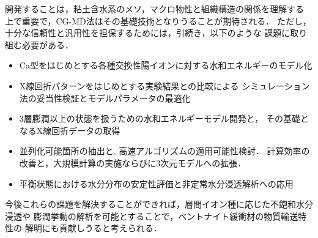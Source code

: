 ﻿\documentclass[11pt,a4j]{jarticle}
\begin{document}
開発することは，粘土含水系のメソ，マクロ物性と組織構造の関係を理解する
上で重要で，CG-MD法はその基礎技術となりうることが期待される．
ただし，十分な信頼性と汎用性を担保するためには，引続き，以下のような
課題に取り組む必要がある．
\begin{itemize}
\item
	Ca型をはじめとする各種交換性陽イオンに対する水和エネルギーのモデル化
\item
	X線回折パターンをはじめとする実験結果との比較による
	シミュレーション法の妥当性検証とモデルパラメータの最適化
\item
    	3層膨潤以上の状態を扱うための水和エネルギーモデル開発と，
	その基礎となるX線回折データの取得
\item
	並列化可能箇所の抽出と, 高速アルゴリズムの適用可能性検討．
	計算効率の改善と，大規模計算の実施ならびに3次元モデルへの拡張．
\item
	平衡状態における水分分布の安定性評価と非定常水分浸透解析への応用
\end{itemize}
今後これらの課題を解決することができれば，層間イオン種に応じた不飽和水分浸透や
膨潤挙動の解析を可能とすることで，ベントナイト緩衝材の物質輸送特性の
解明にも貢献しうると考えられる．
\end{document}
